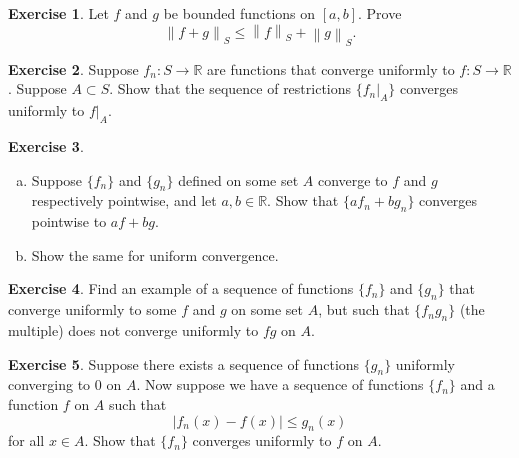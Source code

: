 \documentclass[12pt,openany]{book}
\newcommand{\abs}[1]{\left\lvert {#1} \right\rvert}
\newcommand{\norm}[1]{\left\lVert {#1} \right\rVert}
\newcommand{\R}{{\mathbb{R}}}
\theoremstyle{plain}
\theoremstyle{remark}
\theoremstyle{definition}
\newenvironment{exbox}{%
    \def\FrameCommand{\vrule width 1pt \relax\hspace {10pt}}%
    \MakeFramed {\advance \hsize -\width \FrameRestore }%
}{%
    \endMakeFramed
}
\newenvironment{exparts}{%
    \leavevmode\begin{enumerate}[a),noitemsep,topsep=0pt,parsep=0pt,partopsep=0pt]
}{%
    \end{enumerate}
}
\theoremstyle{exercise}
\newtheorem{exercise}{Exercise}[section]
\theoremstyle{example}
\begin{document}
\begin{exbox}
\begin{exercise}
Let $f$ and $g$ be bounded functions on $[a,b]$.  Prove 
\begin{equation*}
\norm{f+g}_S \leq \norm{f}_S + \norm{g}_S .
\end{equation*}
\end{exercise}


\begin{exercise}
Suppose $f_n \colon S \to \R$ are functions that converge uniformly
to $f \colon S \to \R$.  Suppose $A \subset S$.  Show that
the sequence of restrictions $\{ f_n|_A \}$ converges uniformly to $f|_A$.
\end{exercise}

\begin{exercise}
\begin{exparts}
\item
Suppose $\{ f_n \}$ and $\{ g_n \}$ defined on some set $A$ converge to
$f$ and $g$ respectively pointwise, and let $a,b \in \R$.
Show that $\{ a f_n+ b g_n \}$ converges
pointwise to $a f+ b g$.
\item
Show the same for uniform convergence.
\end{exparts}
\end{exercise}

\begin{exercise}
Find an example of a sequence of functions $\{ f_n \}$ and $\{ g_n \}$
that converge uniformly to some $f$ and $g$ on some set $A$, but such that
$\{ f_ng_n \}$ (the multiple) does not converge uniformly to $fg$ on $A$.
\end{exercise}

\begin{exercise}
Suppose there exists a sequence of functions $\{ g_n \}$ uniformly
converging to $0$ on $A$.  Now suppose we have a sequence of functions
$\{ f_n \}$ and a function $f$ on $A$ such that
\begin{equation*}
\abs{f_n(x) - f(x)} \leq g_n(x) 
\end{equation*}
for all $x \in A$.  Show that $\{ f_n \}$ converges uniformly to $f$ on $A$.
\end{exercise}


\end{exbox}
\end{document}
